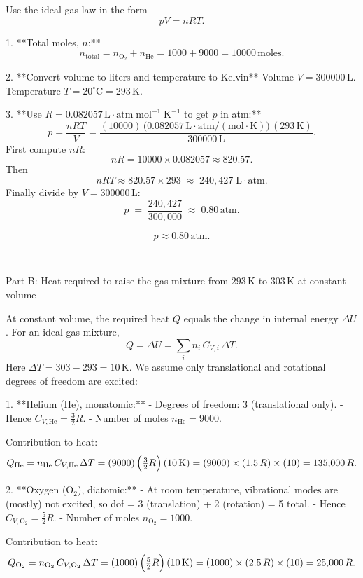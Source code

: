 \documentclass[12pt]{article}
\theoremstyle{definition} %
\theoremstyle{plain} %
\begin{document}
Use the ideal gas law in the form
\[
pV = nRT.
\]

1. **Total moles, \(n\):**  
   \[
   n_{\mathrm{total}} = n_{\mathrm{O_2}} + n_{\mathrm{He}}
   = 1000 + 9000
   = 10000\,\text{moles}.
   \]

2. **Convert volume to liters and temperature to Kelvin**  
   Volume \(V = 300000\,\mathrm{L}\).  
   Temperature \(T = 20^\circ\mathrm{C} = 293\,\mathrm{K}.\)

3. **Use \(R = 0.082057\,\mathrm{L\cdot atm\;mol^{-1}\;K^{-1}}\) to get \(p\) in atm:**  
   \[
   p = \frac{nRT}{V}
     = \frac{(10000)\,\bigl(0.082057\,\mathrm{L\cdot atm/(mol\cdot K)}\bigr)\,(293\,\mathrm{K})}
            {300000\,\mathrm{L}}.
   \]
   First compute \(nR\):
   \[
   nR = 10000 \times 0.082057 \approx 820.57.
   \]
   Then
   \[
   nRT \approx 820.57 \times 293 \;\approx\; 240{,}427\;\mathrm{L\cdot atm}.
   \]
   Finally divide by \(V=300000\,\mathrm{L}\):
   \[
   p \;=\; \frac{240{,}427}{300{,}000}
          \;\approx\; 0.80\,\mathrm{atm}.
   \]

\[
\boxed{p \approx 0.80\,\mathrm{atm}.}
\]

---

Part B: Heat required to raise the gas mixture from \(293\,\mathrm{K}\) to \(303\,\mathrm{K}\) at constant volume

At constant volume, the required heat \(Q\) equals the change in internal energy \(\Delta U\). For an ideal gas mixture,  
\[
Q = \Delta U = \sum_i n_i\, C_{V,i}\,\Delta T.
\]
Here \(\Delta T = 303 - 293 = 10\,\mathrm{K}\). We assume only translational and rotational degrees of freedom are excited:

1. **Helium (He), monatomic:**  
   - Degrees of freedom: 3 (translational only).  
   - Hence \(C_{V,\mathrm{He}} = \tfrac{3}{2}R.\)  
   - Number of moles \(n_{\mathrm{He}} = 9000.\)

   Contribution to heat:
   \[
   Q_{\mathrm{He}}
     = n_{\mathrm{He}}\,C_{V,\mathrm{He}}\,\Delta T
     = (9000)\,\Bigl(\tfrac{3}{2}R\Bigr)\,(10\,\mathrm{K})
     = (9000)\times(1.5\,R)\times(10)
     = 135{,}000\,R.
   \]

2. **Oxygen (\(\mathrm{O_2}\)), diatomic:**  
   - At room temperature, vibrational modes are (mostly) not excited, so dof = 3 (translation) + 2 (rotation) = 5 total.  
   - Hence \(C_{V,\mathrm{O_2}} = \tfrac{5}{2}R.\)  
   - Number of moles \(n_{\mathrm{O_2}} = 1000.\)

   Contribution to heat:
   \[
   Q_{\mathrm{O_2}}
     = n_{\mathrm{O_2}}\,C_{V,\mathrm{O_2}}\,\Delta T
     = (1000)\,\Bigl(\tfrac{5}{2}R\Bigr)\,(10\,\mathrm{K})
     = (1000)\times(2.5\,R)\times(10)
     = 25{,}000\,R.
   \]
\end{document}
